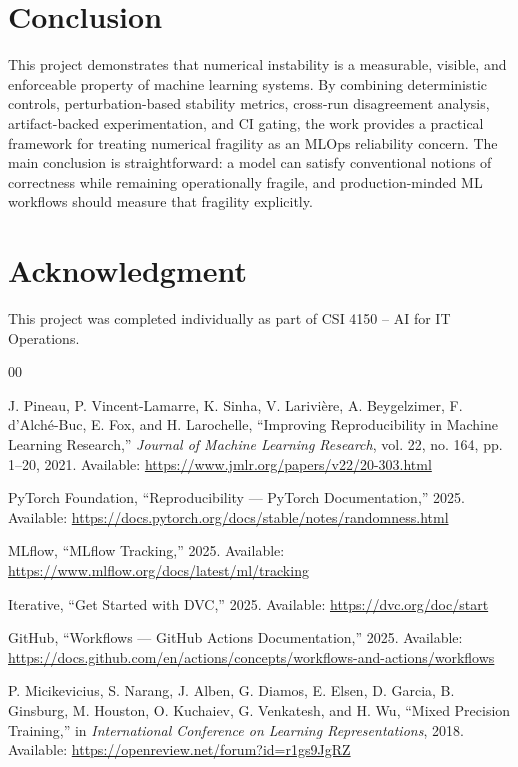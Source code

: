 \documentclass[conference]{IEEEtran}
\begin{document}
\section{Conclusion}

This project demonstrates that numerical instability is a measurable, visible, and enforceable property of machine learning systems. By combining deterministic controls, perturbation-based stability metrics, cross-run disagreement analysis, artifact-backed experimentation, and CI gating, the work provides a practical framework for treating numerical fragility as an MLOps reliability concern. The main conclusion is straightforward: a model can satisfy conventional notions of correctness while remaining operationally fragile, and production-minded ML workflows should measure that fragility explicitly.

\section*{Acknowledgment}

This project was completed individually as part of CSI 4150 -- AI for IT Operations.

\begin{thebibliography}{00}

J. Pineau, P. Vincent-Lamarre, K. Sinha, V. Larivi\`{e}re, A. Beygelzimer, F. d'Alch\'{e}-Buc, E. Fox, and H. Larochelle, ``Improving Reproducibility in Machine Learning Research,'' \emph{Journal of Machine Learning Research}, vol. 22, no. 164, pp. 1--20, 2021. Available: \url{https://www.jmlr.org/papers/v22/20-303.html}

PyTorch Foundation, ``Reproducibility --- PyTorch Documentation,'' 2025. Available: \url{https://docs.pytorch.org/docs/stable/notes/randomness.html}

MLflow, ``MLflow Tracking,'' 2025. Available: \url{https://www.mlflow.org/docs/latest/ml/tracking}

Iterative, ``Get Started with DVC,'' 2025. Available: \url{https://dvc.org/doc/start}

GitHub, ``Workflows --- GitHub Actions Documentation,'' 2025. Available: \url{https://docs.github.com/en/actions/concepts/workflows-and-actions/workflows}

P. Micikevicius, S. Narang, J. Alben, G. Diamos, E. Elsen, D. Garcia, B. Ginsburg, M. Houston, O. Kuchaiev, G. Venkatesh, and H. Wu, ``Mixed Precision Training,'' in \emph{International Conference on Learning Representations}, 2018. Available: \url{https://openreview.net/forum?id=r1gs9JgRZ}

\end{thebibliography}
\end{document}

